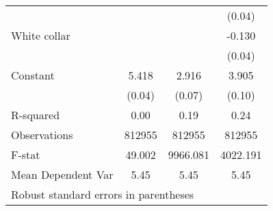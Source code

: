 {\begin{tabular}{l*{3}{c}}
                    &                     &                     &      (0.04)         \\
White collar        &                     &                     &      -0.130\sym{**} \\
                    &                     &                     &      (0.04)         \\
Constant            &       5.418\sym{***}&       2.916\sym{***}&       3.905\sym{***}\\
                    &      (0.04)         &      (0.07)         &      (0.10)         \\
\hline
R-squared           &        0.00         &        0.19         &        0.24         \\
Observations        &      812955         &      812955         &      812955         \\
F-stat              &      49.002         &    9966.081         &    4022.191         \\
Mean Dependent Var  &        5.45         &        5.45         &        5.45         \\
\hline\hline
\multicolumn{4}{l}{\footnotesize Robust standard errors in parentheses}\\
\end{tabular}
}
